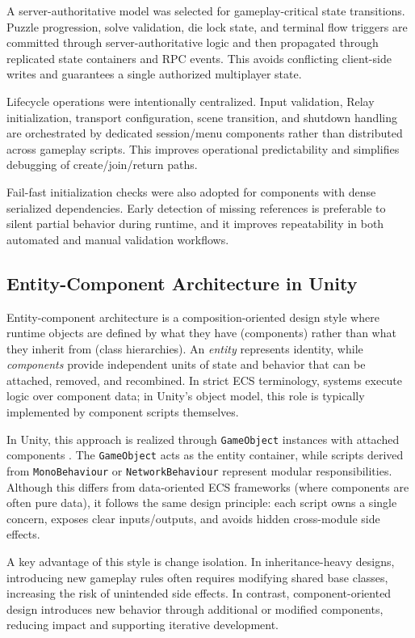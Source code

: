 \newpage

A server-authoritative model was selected for gameplay-critical state transitions. Puzzle progression, solve validation, die lock state, and terminal flow triggers are committed through server-authoritative logic and then propagated through replicated state containers and RPC events. This avoids conflicting client-side writes and guarantees a single authorized  multiplayer state.

Lifecycle operations were intentionally centralized. Input validation, Relay initialization, transport configuration, scene transition, and shutdown handling are orchestrated by dedicated session/menu components rather than distributed across gameplay scripts. This improves operational predictability and simplifies debugging of create/join/return paths.

Fail-fast initialization checks were also adopted for components with dense serialized dependencies. Early detection of missing references is preferable to silent partial behavior during runtime, and it improves repeatability in both automated and manual validation workflows.

\subsection*{Entity-Component Architecture in Unity}
Entity-component architecture is a composition-oriented design style where runtime objects are defined by what they have (components) rather than what they inherit from (class hierarchies). An \emph{entity} represents identity, while \emph{components} provide independent units of state and behavior that can be attached, removed, and recombined. In strict ECS terminology, systems execute logic over component data; in Unity's object model, this role is typically implemented by component scripts themselves.

In Unity, this approach is realized through \texttt{GameObject} instances with attached components \cite{unity_components_docs}. The \texttt{GameObject} acts as the entity container, while scripts derived from \texttt{MonoBehaviour} or \texttt{NetworkBehaviour} represent modular responsibilities. Although this differs from data-oriented ECS frameworks (where components are often pure data), it follows the same design principle: each script owns a single concern, exposes clear inputs/outputs, and avoids hidden cross-module side effects.

A key advantage of this style is change isolation. In inheritance-heavy designs, introducing new gameplay rules often requires modifying shared base classes, increasing the risk of unintended side effects. In contrast, component-oriented design introduces new behavior through additional or modified components, reducing impact and supporting iterative development.

